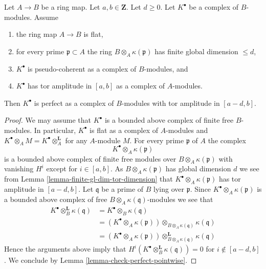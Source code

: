 \begin{lemma}
\label{lemma-perfect-over-polynomial-ring}
Let $A \to B$ be a ring map. Let $a, b \in \mathbf{Z}$. Let $d \geq 0$.
Let $K^\bullet$ be a complex of $B$-modules. Assume
\begin{enumerate}
\item the ring map $A \to B$ is flat,
\item for every prime $\mathfrak p \subset A$ the ring
$B \otimes_A \kappa(\mathfrak p)$ has finite global dimension $\leq d$,
\item $K^\bullet$ is pseudo-coherent as a complex of $B$-modules, and
\item $K^\bullet$ has tor amplitude in $[a, b]$ as a complex
of $A$-modules.
\end{enumerate}
Then $K^\bullet$ is perfect as a complex of $B$-modules
with tor amplitude in $[a - d, b]$.
\end{lemma}

\begin{proof}
We may assume that $K^\bullet$ is a bounded above complex of
finite free $B$-modules. In particular, $K^\bullet$ is flat as a
complex of $A$-modules and
$K^\bullet \otimes_A M = K^\bullet \otimes_A^{\mathbf{L}}$ for any
$A$-module $M$. For every prime $\mathfrak p$ of $A$ the complex
$$
K^\bullet \otimes_A \kappa(\mathfrak p)
$$
is a bounded above complex of finite free modules over
$B \otimes_A \kappa(\mathfrak p)$ with vanishing $H^i$ except
for $i \in [a, b]$. As $B \otimes_A \kappa(\mathfrak p)$
has global dimension $d$ we see from
Lemma \ref{lemma-finite-gl-dim-tor-dimension}
that $K^\bullet \otimes_A \kappa(\mathfrak p)$ has tor amplitude in
$[a - d, b]$. Let $\mathfrak q$ be a prime of $B$ lying over $\mathfrak p$.
Since $K^\bullet \otimes_A \kappa(\mathfrak p)$ is a bounded above
complex of free $B \otimes_A \kappa(\mathfrak q)$-modules we see
that
\begin{align*}
K^\bullet \otimes_B^{\mathbf{L}} \kappa(\mathfrak q)
& = K^\bullet \otimes_B \kappa(\mathfrak q) \\
& = (K^\bullet \otimes_A \kappa(\mathfrak p))
\otimes_{B \otimes_A \kappa(\mathfrak q)} \kappa(\mathfrak q) \\
& = (K^\bullet \otimes_A \kappa(\mathfrak p))
\otimes^{\mathbf{L}}_{B \otimes_A \kappa(\mathfrak q)} \kappa(\mathfrak q)
\end{align*}
Hence the arguments above imply that
$H^i(K^\bullet \otimes_B^{\mathbf{L}} \kappa(\mathfrak q)) = 0$
for $i \not \in [a - d, b]$. We conclude by
Lemma \ref{lemma-check-perfect-pointwise}.
\end{proof}















